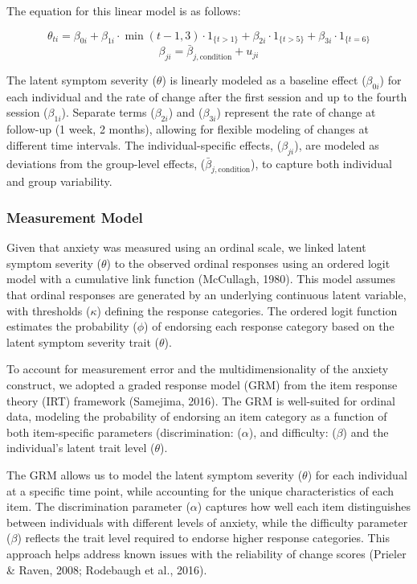 \documentclass[
  man,floatsintext]{apa7}
\begin{document}
The equation for this linear model is as follows:

\[\theta_{ti} = \beta_{0i} + \beta_{1i} \cdot \min(t-1, 3) \cdot 1_{\{t > 1\}} + \beta_{2i} \cdot 1_{\{t > 5\}} + \beta_{3i} \cdot 1_{\{t=6\}}\]
\[\beta_{ji} = \bar{\beta}_{j,\text{condition}} + u_{ji}\]

The latent symptom severity (\(\theta\)) is linearly modeled as a baseline effect (\(\beta_{0i}\)) for each individual and the rate of change after the first session and up to the fourth session (\(\beta_{1i}\)).
Separate terms (\(\beta_{2i}\)) and (\(\beta_{3i}\)) represent the rate of change at follow-up (1 week, 2 months), allowing for flexible modeling of changes at different time intervals.
The individual-specific effects, (\(\beta_{ji}\)), are modeled as deviations from the group-level effects, (\(\bar{\beta}_{j,\text{condition}}\)), to capture both individual and group variability.

\subsubsection{Measurement Model}\label{measurement-model}

Given that anxiety was measured using an ordinal scale, we linked latent symptom severity (\(\theta\)) to the observed ordinal responses using an ordered logit model with a cumulative link function (McCullagh, 1980).
This model assumes that ordinal responses are generated by an underlying continuous latent variable, with thresholds (\(\kappa\)) defining the response categories.
The ordered logit function estimates the probability (\(\phi\)) of endorsing each response category based on the latent symptom severity trait (\(\theta\)).

To account for measurement error and the multidimensionality of the anxiety construct, we adopted a graded response model (GRM) from the item response theory (IRT) framework (Samejima, 2016).
The GRM is well-suited for ordinal data, modeling the probability of endorsing an item category as a function of both item-specific parameters (discrimination: (\(\alpha\)), and difficulty: (\(\beta\)) and the individual's latent trait level (\(\theta\)).

The GRM allows us to model the latent symptom severity (\(\theta\)) for each individual at a specific time point, while accounting for the unique characteristics of each item.
The discrimination parameter (\(\alpha\)) captures how well each item distinguishes between individuals with different levels of anxiety, while the difficulty parameter (\(\beta\)) reflects the trait level required to endorse higher response categories.
This approach helps address known issues with the reliability of change scores (Prieler \& Raven, 2008; Rodebaugh et al., 2016).
\end{document}
